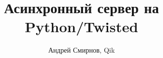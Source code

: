 \documentclass[a4paper,10pt]{article}
\title{Асинхронный сервер на Python/Twisted}
\author{Андрей Смирнов, Qik}
\begin{document}
\maketitle

\begin{abstract}

\end{abstract}

\section{}
\end{document}
